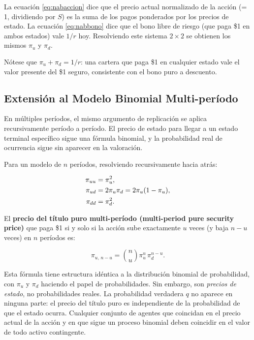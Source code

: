 \documentclass[12pt]{article}
\begin{document}
\begin{intuicionmat}
La ecuaci\'on \eqref{eq:nabaccion} dice que el precio actual normalizado de la acci\'on (= 1, dividiendo por $S$) es la suma de los pagos ponderados por los precios de estado. La ecuaci\'on \eqref{eq:nabbono} dice que el bono libre de riesgo (que paga \$1 en ambos estados) vale $1/r$ hoy. Resolviendo este sistema $2 \times 2$ se obtienen los mismos $\pi_u$ y $\pi_d$.
\end{intuicionmat}

N\'otese que $\pi_u + \pi_d = 1/r$: una cartera que paga \$1 en cualquier estado vale el valor presente del \$1 seguro, consistente con el bono puro a descuento.

\subsection{Extensi\'on al Modelo Binomial Multi-per\'iodo}

\begin{intuicion}
En m\'ultiples per\'iodos, el mismo argumento de replicaci\'on se aplica recursivamente per\'iodo a per\'iodo. El precio de estado para llegar a un estado terminal espec\'ifico sigue una f\'ormula binomial, y la probabilidad real de ocurrencia sigue sin aparecer en la valoraci\'on.
\end{intuicion}

Para un modelo de $n$ per\'iodos, resolviendo recursivamente hacia atr\'as:

\begin{align}
  \pi_{uu} &= \pi_u^2, \notag \\
  \pi_{ud} &= 2\pi_u\pi_d = 2\pi_u(1-\pi_u), \notag \\
  \pi_{dd} &= \pi_d^2.
\end{align}

El \textbf{precio del t\'itulo puro multi-per\'iodo (multi-period pure security price)} que paga \$1 si y solo si la acci\'on sube exactamente $u$ veces (y baja $n - u$ veces) en $n$ per\'iodos es:

\begin{equation}
  \pi_{u,\,n-u} = \binom{n}{u} \pi_u^u\, \pi_d^{n-u}.
  \label{eq:binomialpure}
\end{equation}

\begin{intuicionmat}
Esta f\'ormula tiene estructura id\'entica a la distribuci\'on binomial de probabilidad, con $\pi_u$ y $\pi_d$ haciendo el papel de probabilidades. Sin embargo, son \textit{precios de estado}, no probabilidades reales. La probabilidad verdadera $q$ no aparece en ninguna parte: el precio del t\'itulo puro es independiente de la probabilidad de que el estado ocurra. Cualquier conjunto de agentes que coincidan en el precio actual de la acci\'on y en que sigue un proceso binomial deben coincidir en el valor de todo activo contingente.
\end{intuicionmat}
\end{document}
